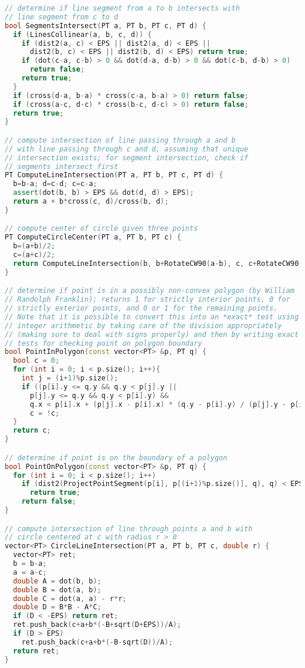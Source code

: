 \begin{lstlisting}[language=C++]
// determine if line segment from a to b intersects with 
// line segment from c to d
bool SegmentsIntersect(PT a, PT b, PT c, PT d) {
  if (LinesCollinear(a, b, c, d)) {
    if (dist2(a, c) < EPS || dist2(a, d) < EPS ||
      dist2(b, c) < EPS || dist2(b, d) < EPS) return true;
    if (dot(c-a, c-b) > 0 && dot(d-a, d-b) > 0 && dot(c-b, d-b) > 0)
      return false;
    return true;
  }
  if (cross(d-a, b-a) * cross(c-a, b-a) > 0) return false;
  if (cross(a-c, d-c) * cross(b-c, d-c) > 0) return false;
  return true;
}

// compute intersection of line passing through a and b
// with line passing through c and d, assuming that unique
// intersection exists; for segment intersection, check if
// segments intersect first
PT ComputeLineIntersection(PT a, PT b, PT c, PT d) {
  b=b-a; d=c-d; c=c-a;
  assert(dot(b, b) > EPS && dot(d, d) > EPS);
  return a + b*cross(c, d)/cross(b, d);
}

// compute center of circle given three points
PT ComputeCircleCenter(PT a, PT b, PT c) {
  b=(a+b)/2;
  c=(a+c)/2;
  return ComputeLineIntersection(b, b+RotateCW90(a-b), c, c+RotateCW90(a-c));
}

// determine if point is in a possibly non-convex polygon (by William
// Randolph Franklin); returns 1 for strictly interior points, 0 for
// strictly exterior points, and 0 or 1 for the remaining points.
// Note that it is possible to convert this into an *exact* test using
// integer arithmetic by taking care of the division appropriately
// (making sure to deal with signs properly) and then by writing exact
// tests for checking point on polygon boundary
bool PointInPolygon(const vector<PT> &p, PT q) {
  bool c = 0;
  for (int i = 0; i < p.size(); i++){
    int j = (i+1)%p.size();
    if ((p[i].y <= q.y && q.y < p[j].y || 
      p[j].y <= q.y && q.y < p[i].y) &&
      q.x < p[i].x + (p[j].x - p[i].x) * (q.y - p[i].y) / (p[j].y - p[i].y))
      c = !c;
  }
  return c;
}

// determine if point is on the boundary of a polygon
bool PointOnPolygon(const vector<PT> &p, PT q) {
  for (int i = 0; i < p.size(); i++)
    if (dist2(ProjectPointSegment(p[i], p[(i+1)%p.size()], q), q) < EPS)
      return true;
    return false;
}

// compute intersection of line through points a and b with
// circle centered at c with radius r > 0
vector<PT> CircleLineIntersection(PT a, PT b, PT c, double r) {
  vector<PT> ret;
  b = b-a;
  a = a-c;
  double A = dot(b, b);
  double B = dot(a, b);
  double C = dot(a, a) - r*r;
  double D = B*B - A*C;
  if (D < -EPS) return ret;
  ret.push_back(c+a+b*(-B+sqrt(D+EPS))/A);
  if (D > EPS)
    ret.push_back(c+a+b*(-B-sqrt(D))/A);
  return ret;
}


\end{lstlisting}
